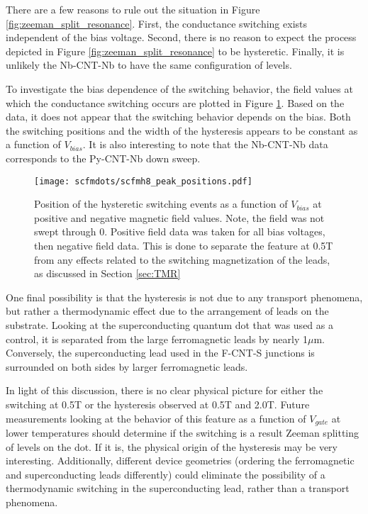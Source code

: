 There are a few reasons to rule out the situation in Figure \ref{fig:zeeman_split_resonance}. First, the conductance switching exists independent of the bias voltage. Second, there is no reason to expect the process depicted in Figure \ref{fig:zeeman_split_resonance} to be hysteretic. Finally, it is unlikely the Nb-CNT-Nb to have the same configuration of levels.

To investigate the bias dependence of the switching behavior, the field values at which the conductance switching occurs are plotted in Figure \ref{fig:scfmh8_peak_positions}. Based on the data, it does not appear that the switching behavior depends on the bias. Both the switching positions and the width of the hysteresis appears to be constant as a function of $V_{bias}$. It is also interesting to note that the Nb-CNT-Nb data corresponds to the Py-CNT-Nb down sweep.

\begin{figure}
    \centering
    \texttt{[image: scfmdots/scfmh8\_peak\_positions.pdf]}
    \caption{Position of the hysteretic switching events as a function of $V_{bias}$ at positive and negative magnetic field values. Note, the field was not swept through 0. Positive field data was taken for all bias voltages, then negative field data. This is done to separate the feature at 0.5T from any effects related to the switching magnetization of the leads, as discussed in Section \ref{sec:TMR}}
    \label{fig:scfmh8_peak_positions}
\end{figure}

One final possibility is that the hysteresis is not due to any transport phenomena, but rather a thermodynamic effect due to the arrangement of leads on the substrate. Looking at the superconducting quantum dot that was used as a control, it is separated from the large ferromagnetic leads by nearly 1$\mu$m. Conversely, the superconducting lead used in the F-CNT-S junctions is surrounded on both sides by larger ferromagnetic leads. 

In light of this discussion, there is no clear physical picture for either the switching at 0.5T or the hysteresis observed at 0.5T and 2.0T. Future measurements looking at the behavior of this feature as a function of $V_{gate}$ at lower temperatures should determine if the switching is a result Zeeman splitting of levels on the dot. If it is, the physical origin of the hysteresis may be very interesting. Additionally, different device geometries (ordering the ferromagnetic and superconducting leads differently) could eliminate the possibility of a thermodynamic switching in the superconducting lead, rather than a transport phenomena.